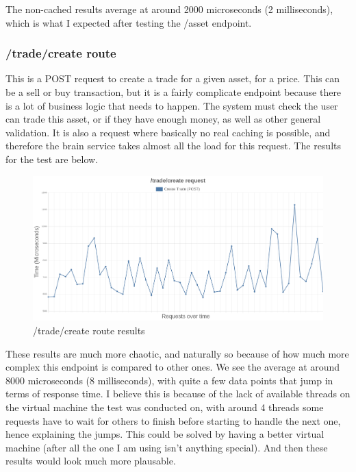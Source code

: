 \documentclass[titlepage]{article}
\begin{document}
The non-cached results average at around 2000 microseconds (2 milliseconds), which is what I expected after testing the /asset endpoint.

\pagebreak
\subsubsection{/trade/create route}
This is a POST request to create a trade for a given asset, for a price. This can be a sell or buy transaction, but it is a fairly complicate endpoint because there is a lot of business logic that needs to happen. The system must check the user can trade this asset, or if they have enough money, as well as other general validation. It is also a request where basically no real caching is possible, and therefore the brain service takes almost all the load for this request. The results for the test are below.

\begin{figure}[h!]
\includegraphics[width=\textwidth]{../results/create-trade.png}
  \caption{/trade/create route results}
\end{figure}

These results are much more chaotic, and naturally so because of how much more complex this endpoint is compared to other ones. We see the average at around 8000 microseconds (8 milliseconds), with quite a few data points that jump in terms of response time. I believe this is because of the lack of available threads on the virtual machine the test was conducted on, with around 4 threads some requests have to wait for others to finish before starting to handle the next one, hence explaining the jumps. This could be solved by having a better virtual machine (after all the one I am using isn't anything special). And then these results would look much more plausable. \\

\pagebreak
\end{document}
